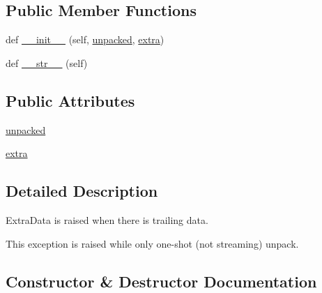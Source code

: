 \subsection*{Public Member Functions}
\begin{DoxyCompactItemize}
\item 
def \hyperlink{classpip_1_1__vendor_1_1msgpack_1_1exceptions_1_1ExtraData_ae42a3a4682e0d92594ccf3b2a8984583}{\+\_\+\+\_\+init\+\_\+\+\_\+} (self, \hyperlink{classpip_1_1__vendor_1_1msgpack_1_1exceptions_1_1ExtraData_a43525b229d0d573e376e955f1cffd662}{unpacked}, \hyperlink{classpip_1_1__vendor_1_1msgpack_1_1exceptions_1_1ExtraData_a723cbfd5b604b1ed87d3892aaffdf456}{extra})
\item 
def \hyperlink{classpip_1_1__vendor_1_1msgpack_1_1exceptions_1_1ExtraData_a056dff47a16e68e50da9142610d0cd67}{\+\_\+\+\_\+str\+\_\+\+\_\+} (self)
\end{DoxyCompactItemize}
\subsection*{Public Attributes}
\begin{DoxyCompactItemize}
\item 
\hyperlink{classpip_1_1__vendor_1_1msgpack_1_1exceptions_1_1ExtraData_a43525b229d0d573e376e955f1cffd662}{unpacked}
\item 
\hyperlink{classpip_1_1__vendor_1_1msgpack_1_1exceptions_1_1ExtraData_a723cbfd5b604b1ed87d3892aaffdf456}{extra}
\end{DoxyCompactItemize}


\subsection{Detailed Description}
\begin{DoxyVerb}ExtraData is raised when there is trailing data.

This exception is raised while only one-shot (not streaming)
unpack.
\end{DoxyVerb}
 

\subsection{Constructor \& Destructor Documentation}
\mbox{\label{classpip_1_1__vendor_1_1msgpack_1_1exceptions_1_1ExtraData_ae42a3a4682e0d92594ccf3b2a8984583}} 
